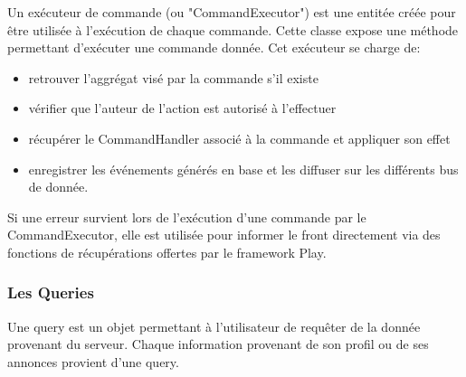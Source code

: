 Un exécuteur de commande (ou "CommandExecutor") est une entitée créée pour être utilisée à l'exécution de chaque commande.
Cette classe expose une méthode permettant d'exécuter une commande donnée.
Cet exécuteur se charge de:
\begin{itemize}
  \item retrouver l'aggrégat visé par la commande s'il existe
  \item vérifier que l'auteur de l'action est autorisé à l'effectuer
  \item récupérer le CommandHandler associé à la commande et appliquer son effet
  \item enregistrer les événements générés en base et les diffuser sur les différents bus de donnée.
\end{itemize}
Si une erreur survient lors de l'exécution d'une commande par le CommandExecutor, elle est utilisée pour informer le front directement via des fonctions de récupérations offertes par le framework Play.

\subsubsection{Les Queries}
\label{sub:Les Queries}
Une query est un objet permettant à l'utilisateur de requêter de la donnée provenant du serveur.
Chaque information provenant de son profil ou de ses annonces provient d'une query.
